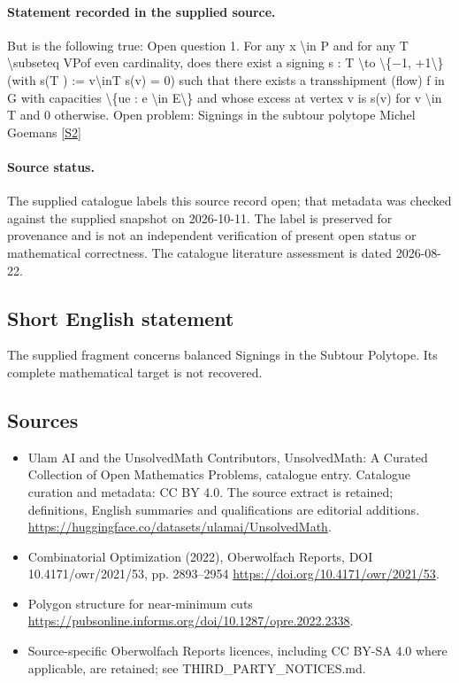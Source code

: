 \documentclass[11pt]{article}
\newcommand{\sref}[2]{\hyperlink{source:#1:#2}{[S#2]}}
\begin{document}
\paragraph{Statement recorded in the supplied source.}
But is the following true: Open question 1. For any x \textbackslash{}in P and for any T \textbackslash{}subseteq VPof even cardinality, does there exist a signing s : T \textbackslash{}to \textbackslash{}\{−1, +1\textbackslash{}\} (with s(T ) := v\textbackslash{}inT s(v) = 0) such that there exists a transshipment (flow) f in G with capacities \textbackslash{}\{ue : e \textbackslash{}in E\textbackslash{}\} and whose excess at vertex v is s(v) for v \textbackslash{}in T and 0 otherwise. Open problem: Signings in the subtour polytope Michel Goemans \sref{statement}{2}
\paragraph{Source status.}
The supplied catalogue labels this source record open; that metadata was checked against the supplied snapshot on 2026-10-11. The label is preserved for provenance and is not an independent verification of present open status or mathematical correctness. The catalogue literature assessment is dated 2026-08-22.
\subsection{Short English statement}
The supplied fragment concerns balanced Signings in the Subtour Polytope. Its complete mathematical target is not recovered.
\subsection{Sources}
\begin{itemize}
\item[\hypertarget{source:statement:1}{S1}] Ulam AI and the UnsolvedMath Contributors, UnsolvedMath: A Curated Collection of Open Mathematics Problems, catalogue entry. Catalogue curation and metadata: CC BY 4.0. The source extract is retained; definitions, English summaries and qualifications are editorial additions.
\url{https://huggingface.co/datasets/ulamai/UnsolvedMath}.
\item[\hypertarget{source:statement:2}{S2}] Combinatorial Optimization (2022), Oberwolfach Reports, DOI 10.4171/owr/2021/53, pp. 2893--2954
\url{https://doi.org/10.4171/owr/2021/53}.
\item[\hypertarget{source:statement:3}{S3}] Polygon structure for near-minimum cuts
\url{https://pubsonline.informs.org/doi/10.1287/opre.2022.2338}.
\item Source-specific Oberwolfach Reports licences, including CC BY-SA 4.0 where applicable, are retained; see THIRD\_PARTY\_NOTICES.md.
\end{itemize}
\end{document}
